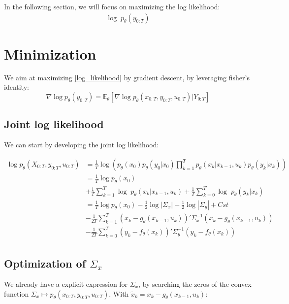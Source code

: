 \documentclass[10pt,a4paper]{report}
\begin{document}
In the following section, we will focus on maximizing the log likelihood:
\begin{align}
	\log \; p_{\theta}(y_{0:T})
	\label{log_likelihood}
\end{align}

\section{Minimization}
We aim at maximizing \ref{log_likelihood} by gradient descent, by leveraging fisher's identity:
$$
	\nabla \log p_\theta(y_{0:T}) = \mathbb{E}_\theta \left[ \nabla\log p_\theta(x_{0:T}, y_{0:T}, u_{0:T}) | Y_{0:T} \right]
$$
\subsection{Joint log likelihood}
We can start by developing the joint log likelihood:

\begin{align*}
	\log p_{\theta}(X_{0:T}, y_{0:T}, u_{0:T}) & = \frac{1}{T} \log\left(p_\theta(x_0)p_\theta(y_0 | x_0)\prod_{k=1}^{T} p_{\theta}(x_k | x_{k-1}, u_k) p_{\theta}(y_k | x_k)\right) \\
						   & = \frac{1}{T} \log p_\theta(x_0)                                                                                                    \\
						   & + \frac{1}{T} \sum_{k=1}^{T} \log \; p_{\theta}(x_k | x_{k-1}, u_k) + \frac{1}{T} \sum_{k=0}^{T} \log \; p_{\theta}(y_k | x_k)      \\
						   & = \frac{1}{T} \log p_\theta(x_0) -\frac{1}{2} \log|\Sigma_x| -\frac{1}{2} \log|\Sigma_y| + Cst                                      \\
						   & - \frac{1}{2T} \sum_{k=1}^{T}(x_k - g_\theta(x_{k-1}, u_{k}))' \Sigma_x^{-1} (x_k - g_\theta(x_{k-1}, u_{k}))                       \\
						   & - \frac{1}{2T} \sum_{k=0}^{T}(y_k - f_\theta(x_k))' \Sigma_y^{-1} (y_k - f_\theta(x_k))                                             \\
\end{align*}

\subsection{Optimization of $\Sigma_x$}
We already have a explicit expression for $\Sigma_x$, by searching the zeros of the convex function $\Sigma_x \mapsto p_\theta(x_{0:T}, y_{0:T}, u_{0:T})$.
With $\tilde x_k = x_k - g_\theta(x_{k-1}, u_k)$:
\end{document}
